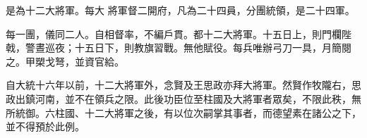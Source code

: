 \begin{pinyinscope}
 是為十二大將軍。每大
 將軍督二開府，凡為二十四員，分團統領，是二十四軍。



 每一團，儀同二人。自相督率，不編戶貫。都十二大將軍。十五日上，則門欄陛戟，警晝巡夜；十五日下，則教旗習戰。無他賦役。每兵唯辦弓刀一具，月簡閱之。甲槊戈弩，並資官給。



 自大統十六年以前，十二大將軍外，念賢及王思政亦拜大將軍。然賢作牧隴右，思政出鎮河南，並不在領兵之限。此後功臣位至柱國及大將軍者眾矣，不限此秩，無所統御。六柱國、十二大將軍之後，有以位次嗣掌其事者，而德望素在諸公之下，並不得預於此例。



\end{pinyinscope}